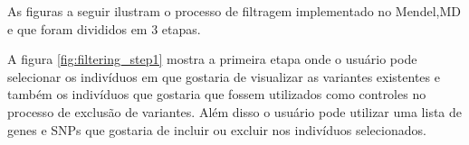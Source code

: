 As figuras a seguir ilustram o processo de filtragem implementado no Mendel,MD e que foram divididos em 3 etapas.
% 

A figura \ref{fig:filtering_step1} mostra a primeira etapa onde o usuário pode selecionar os indivíduos em que gostaria de visualizar as variantes existentes e também os indivíduos que gostaria que fossem utilizados como controles no processo de exclusão de variantes. Além disso o usuário pode utilizar uma lista de genes e SNPs que gostaria de incluir ou excluir nos indivíduos selecionados.

